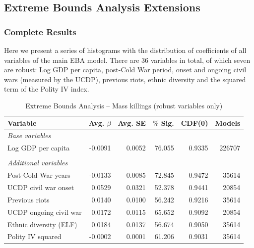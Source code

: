 \newpage

\subsection{Extreme Bounds Analysis Extensions}
\label{sec:mk-ebae}

\subsubsection{Complete Results}

Here we present a series of histograms with the distribution of coefficients of all variables of the main EBA model. There are 36 variables in total, of which seven are robust: Log GDP per capita, post-Cold War period, onset and ongoing civil wars (measured by the UCDP), previous riots, ethnic diversity and the squared term of the Polity IV index.

\vspace{1cm}

\begin{table}[H]
\centering
\begin{tabular}{lrrrrr}
\hline
\textbf{Variable} & \textbf{Avg. $\beta$} & \textbf{Avg. SE} & \textbf{$\%$ Sig.} & \textbf{CDF(0)} & \textbf{Models} \\ \hline
\textit{Base variables} &  &  &  &  &  \\
Log GDP per capita & -0.0091 & 0.0052 & 76.055 & 0.9335 & 226707 \\
 &  &  &  &  &  \\
\textit{Additional variables} &  &  &  &  &  \\
Post-Cold War years & -0.0133 & 0.0085 & 72.845 & 0.9472 & 35614 \\
UCDP civil war onset & 0.0529 & 0.0321 & 52.378 & 0.9441 & 20854 \\
Previous riots & 0.0140 & 0.0100 & 56.242 & 0.9216 & 35614 \\
UCDP ongoing civil war & 0.0172 & 0.0115 & 65.652 & 0.9092 & 20854 \\
Ethnic diversity (ELF) & 0.0184 & 0.0137 & 56.674 & 0.9050 & 35614 \\
Polity IV squared & -0.0002 & 0.0001 & 61.206 & 0.9031 & 35614 \\ \hline
\end{tabular}
\caption{Extreme Bounds Analysis -- Mass killings (robust variables only)}
\label{tab:eba1}
\end{table}

